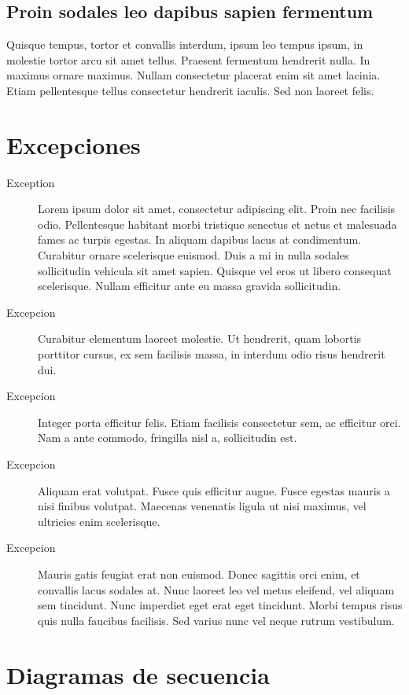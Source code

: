 \documentclass[titlepage,a4paper]{article}
\begin{document}
\subsection{Proin sodales leo dapibus sapien fermentum}
Quisque tempus, tortor et convallis interdum, ipsum leo tempus ipsum, in molestie tortor arcu sit amet tellus. Praesent fermentum hendrerit nulla. In maximus ornare maximus. Nullam consectetur placerat enim sit amet lacinia. Etiam pellentesque tellus consectetur hendrerit iaculis. Sed non laoreet felis.

\section{Excepciones}\label{sec:excepciones}

\begin{description}
\item[Exception] Lorem ipsum dolor sit amet, consectetur adipiscing elit. Proin nec facilisis odio. Pellentesque habitant morbi tristique senectus et netus et malesuada fames ac turpis egestas. In aliquam dapibus lacus at condimentum. Curabitur ornare scelerisque euismod. Duis a mi in nulla sodales sollicitudin vehicula sit amet sapien. Quisque vel eros ut libero consequat scelerisque. Nullam efficitur ante eu massa gravida sollicitudin.
\item[Excepcion] Curabitur elementum laoreet molestie. Ut hendrerit, quam lobortis porttitor cursus, ex sem facilisis massa, in interdum odio risus hendrerit dui.
\item[Excepcion] Integer porta efficitur felis. Etiam facilisis consectetur sem, ac efficitur orci. Nam a ante commodo, fringilla nisl a, sollicitudin est.
\item[Excepcion] Aliquam erat volutpat. Fusce quis efficitur augue. Fusce egestas mauris a nisi finibus volutpat. Maecenas venenatis ligula ut nisi maximus, vel ultricies enim scelerisque.
\item[Excepcion] Mauris gatis feugiat erat non euismod. Donec sagittis orci enim, et convallis lacus sodales at. Nunc laoreet leo vel metus eleifend, vel aliquam sem tincidunt. Nunc imperdiet eget erat eget tincidunt. Morbi tempus risus quis nulla faucibus facilisis. Sed varius nunc vel neque rutrum vestibulum.
\end{description}

\section{Diagramas de secuencia}\label{sec:diagramasdesecuencia}
\end{document}
